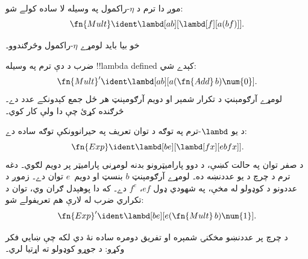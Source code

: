 \documentclass[../../../include/open-logic-section]{subfiles}
\begin{document}
\begin{editorial}
موږ دا ترم د $\eta$-راکمول په وسيله لا ساده کولے شو:
\[
  \fn{Mult} \ident \lambd[ab][\lambd[f][a (b f)]].
\]

خو بيا بايد لومړے $\eta$-راکمول وڅرګندوو۔
\end{editorial}

\begin{prob}
ضرب د دې ترم په وسيله !!{lambda define}d کېدے شي:
\[
  \fn{Mult}' \ident \lambd[ab][a (\fn{Add}\, b) \num{0}].
\]
لومړے آرګومېنټ د تکرار شمېر او دويم آرګومېنټ هر ځل جمع کېدونکے عدد دے۔
څرګنده کړئ چې دا ولې کار کوي۔
\end{prob}

د يو $\lambd$-ترم په توګه د توان تعريف په حيرانوونکې توګه
ساده دے:
\[
  \fn{Exp} \ident \lambd[be][\lambd[fx][e b f x]].
\]
د صفر توان په حالت کښې، د دوو پاراميټرونو بدنه لومړنی پاراميټر پر دويم لګوي۔ دغه ترم د چرچ د يو عددنښه ده۔
لومړے آرګومېنټ $b$ بنسټ او دويم~$e$ توان دے۔ زموږ د
عددونو د کوډولو له مخې، په شهودي ډول $e f$، $f^e$ دے۔
که دا پوهېدل ګران وي، توان د تکراري ضرب له لارې هم
تعريفولے شو:
\[
  \fn{Exp}' \ident \lambd[be][e (\fn{Mult}\, b) \num{1}].
\]

د چرچ پر عددنښو مخکنۍ شمېره او تفريق دومره ساده نۀ دي لکه
چې ښايي فکر وکړو: د جوړو کوډولو ته اړتيا لري۔
\end{document}
